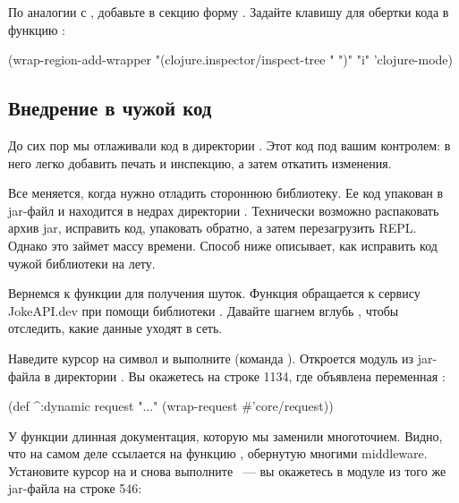 По аналогии с , добавьте в секцию  форму . Задайте клавишу для обертки кода в функцию :

\begin{english}
  \begin{clojure}
(wrap-region-add-wrapper
  "(clojure.inspector/inspect-tree "
  ")"
  "i"
  'clojure-mode)
  \end{clojure}
\end{english}

\subsection{Внедрение в чужой код}

До сих пор мы отлаживали код в директории . Этот код под вашим контролем: в него легко добавить печать и инспекцию, а затем откатить изменения.

Все меняется, когда нужно отладить стороннюю библиотеку. Ее код упакован в jar-файл и находится в недрах директории . Технически возможно распаковать архив jar, исправить код, упаковать обратно, а затем перезагрузить REPL. Однако это займет массу времени. Способ ниже описывает, как исправить код чужой библиотеки на лету.

Вернемся к функции  для получения шуток. Функция обращается к сервису JokeAPI.dev при помощи библиотеки . Давайте шагнем вглубь , чтобы отследить, какие данные уходят в сеть.

Наведите курсор на символ  и выполните  (команда ). Откроется модуль  из jar-файла в директории . Вы окажетесь на строке 1134, где объявлена переменная :

\begin{english}
  \begin{clojure}
(def ^:dynamic request
  "..."
  (wrap-request #'core/request))
  \end{clojure}
\end{english}

У функции длинная документация, которую мы заменили многоточием. Видно, что  на самом деле ссылается на функцию , обернутую многими middleware. Установите курсор на  и снова выполните ~--- вы окажетесь в модуле  из того же jar-файла на строке 546:

